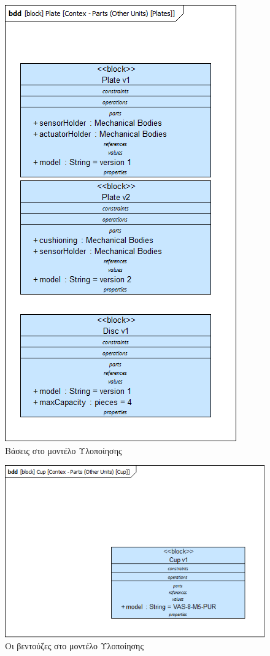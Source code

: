 \documentclass[a4paper,12pt,twoside]{report}
\begin{document}
\begin{appendices}
				\begin{figure}[hp]
					\centering
					\includegraphics[scale=0.50]{DesignModel_Contex-Parts(OtherUnits)[Plates].png}
					\caption{Βάσεις στο μοντέλο Υλοποίησης}
					\label{φωτ:Βάσεις στο μοντέλο Υλοποίησης}
				\end{figure}
				
				\begin{figure}[hp]
					\centering
					\includegraphics[scale=0.50]{DesignModel_Contex-Parts(OtherUnits)[Cup].png}
					\caption{Οι βεντούζες στο μοντέλο Υλοποίησης}
					\label{φωτ:Οι βεντούζες στο μοντέλο Υλοποίησης}
				\end{figure}
				

\end{appendices}
\end{document}
